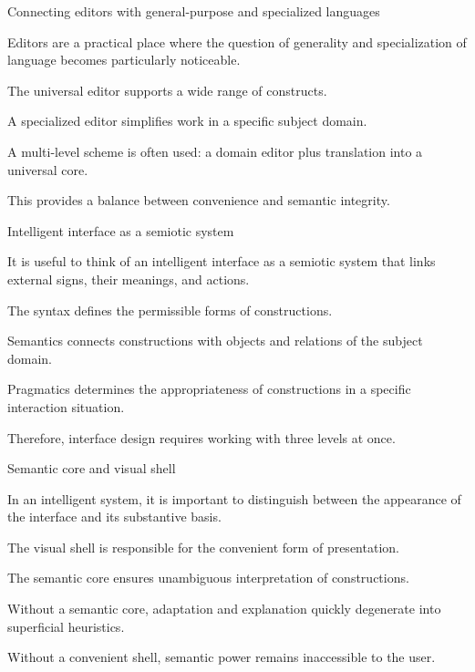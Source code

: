 \begin{frame}{Connecting editors with general-purpose and specialized languages}
	\topline
	\justifying
	
	Editors are a practical place where the question of generality and specialization of language becomes particularly noticeable.
	
	\begin{textitemize}
		\item The universal editor supports a wide range of constructs.
		\item A specialized editor simplifies work in a specific subject domain.
		\item A multi-level scheme is often used: a domain editor plus translation into a universal core.
		\item This provides a balance between convenience and semantic integrity.
	\end{textitemize}
\end{frame}

\begin{frame}{Intelligent interface as a semiotic system}
	\topline
	\justifying
	
	It is useful to think of an intelligent interface as a semiotic system that links external signs, their meanings, and actions.
	
	\begin{textitemize}
		\item The syntax defines the permissible forms of constructions.
		\item Semantics connects constructions with objects and relations of the subject domain.
		\item Pragmatics determines the appropriateness of constructions in a specific interaction situation.
		\item Therefore, interface design requires working with three levels at once.
	\end{textitemize}
\end{frame}

\begin{frame}{Semantic core and visual shell}
	\topline
	\justifying
	
	In an intelligent system, it is important to distinguish between the appearance of the interface and its substantive basis.
	
	\begin{textitemize}
		\item The visual shell is responsible for the convenient form of presentation.
		\item The semantic core ensures unambiguous interpretation of constructions.
		\item Without a semantic core, adaptation and explanation quickly degenerate into superficial heuristics.
		\item Without a convenient shell, semantic power remains inaccessible to the user.
	\end{textitemize}
\end{frame}


